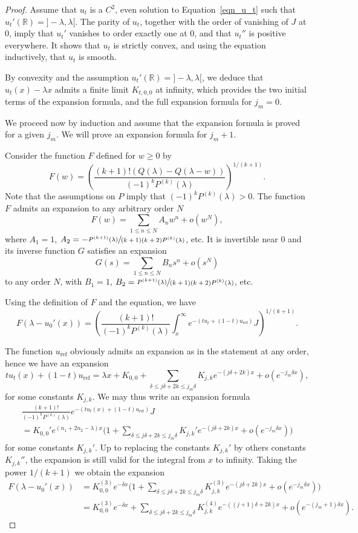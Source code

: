 \documentclass[JEP,XML,SOM,Unicode, NoEqCountersInSection, NoFloatCountersInSection]{cedram}
\theoremstyle{plain}
\theoremstyle{definition}
\begin{document}
\begin{proof}
Assume that $u_t$ is a $C^2$, even solution to Equation~\eqref{eqn_u_t}
such that $u_t'(\mathbb{R})={}]-\lambda,\lambda[$. The parity of $u_t$, together
with the order of vanishing of $J$ at $0$, imply that $u_t'$ vanishes to order
exactly one at $0$, and that $u_t''$ is positive everywhere. It shows that $u_t$
is strictly convex, and using the equation inductively, that $u_t$ is smooth.

By convexity and the assumption $u_t'(\mathbb{R})={}]-\lambda,\lambda[$, we deduce
that $u_t(x)-\lambda x$ admits a finite limit $K_{t,0,0}$ at infinity, which
provides the two initial terms of the expansion formula, and the full expansion
formula for $j_m=0$.

We proceed now by induction and assume that the expansion formula is proved
for a given $j_m$. We will prove an expansion formula for
$j_m+1$.

Consider the function $F$ defined for $w\geq 0$ by
\[ F(w)=\left( \frac{(k+1)!(Q(\lambda)-Q(\lambda-w))}{(-1)^kP^{(k)}(\lambda)} \right)^{1/(k+1)}. \]
Note that the assumptions on $P$ imply that $(-1)^kP^{(k)}(\lambda)>0$.
The function $F$ admits an expansion to any arbitrary order $N$
\[ F(w)= \sum_{1\leq n\leq N}A_nw^n +o(w^N), \]
where $A_1=1$, $A_2=-\sfrac{P^{(k+1)}(\lambda)}{(k+1)(k+2)P^{(k)}(\lambda)}$, etc.
It is invertible near $0$ and its inverse function $G$ satisfies an expansion
\[ G(s)= \sum_{1\leq n\leq N}B_ns^n +o(s^N) \]
to any order $N$, with $B_1=1$,
$B_2=\sfrac{P^{(k+1)}(\lambda)}{(k+1)(k+2)P^{(k)}(\lambda)}$, etc.

Using the definition of $F$ and the equation, we have
\[ F(\lambda-u_0'(x)) =
\left(\frac{(k+1)!}{(-1)^kP^{(k)}(\lambda)}
\int_x^{\infty}e^{-(tu_t+(1-t)u_{\mathrm{ref}})}J\right)^{1/(k+1)}. \]

The function $u_{\mathrm{ref}}$ obviously admits an expansion as in the
statement at any order, hence we have an expansion
\[ tu_t(x)+(1-t)u_{\mathrm{ref}}= \lambda x +K_{0,0}+
\sum_{\delta\leq j\delta+2k\leq j_m\delta}K_{j,k}e^{-(j\delta+2k)x}
+o(e^{-j_m\delta x}), \]
for some constants $K_{j,k}$.
We may thus write an expansion formula
\begin{multline*}
\frac{(k+1)!}{(-1)^kP^{(k)}(\lambda)}e^{-(tu_t(x)+(1-t)u_{\mathrm{ref}})}J \\
= K_{0,0}'e^{(n_1+2n_2-\lambda)x} \biggl( 1+
\sum_{\delta\leq j\delta+2k\leq j_m\delta}K_{j,k}'e^{-(j\delta+2k)x}
+o(e^{-j_m \delta x}) \biggr)
\end{multline*}
for some constants $K_{j,k}'$. Up to replacing the constants $K_{j,k}'$
by others constants $K_{j,k}''$, the expansion is still valid for the integral
from $x$ to infinity.
Taking the power $1/(k+1)$ we obtain the expansion
\begin{align*}
F(\lambda-u_0'(x)) & = K_{0,0}^{(3)}e^{-\delta x} \biggl( 1 +
\sum_{\delta\leq j\delta+2k\leq j_m\delta}K_{j,k}^{(3)}e^{-(j\delta+2k)x}
+o(e^{-j_m \delta x}) \biggr)
\\
&
= K_{0,0}^{(3)}e^{-\delta x} +
\sum_{\delta\leq j\delta+2k\leq j_m\delta}K_{j,k}^{(4)}e^{-((j+1)\delta+2k)x}
+o(e^{-(j_m+1)\delta x}).
\end{align*}


\end{proof}
\end{document}
